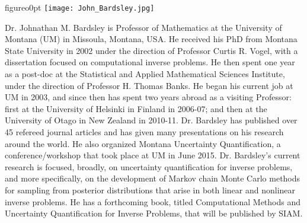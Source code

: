 \begin{wrapfloat}{figure}{o}{0pt}
\texttt{[image: John\_Bardsley.jpg]}
\end{wrapfloat}
Dr. Johnathan M. Bardsley is Professor of Mathematics at the University of Montana (UM) in Missoula, Montana, USA. He received his PhD from Montana State University in 2002 under the direction of Professor Curtis R. Vogel, with a dissertation focused on computational inverse problems. He then spent one year as a post-doc at the Statistical and Applied Mathematical Sciences Institute, under the direction of Professor H. Thomas Banks. He began his current job at UM in 2003, and since then has spent two years abroad as a visiting Professor: first at the University of Helsinki in Finland in 2006-07; and then at the University of Otago in New Zealand in 2010-11. Dr. Bardsley has published over 45 refereed journal articles and has given many presentations on his research around the world. He also organized Montana Uncertainty Quantification, a conference/workshop that took place at UM in June 2015. Dr. Bardsley's current research is focused, broadly, on uncertainty quantification for inverse problems, and more specifically, on the development of Markov chain Monte Carlo methods for sampling from posterior distributions that arise in both linear and nonlinear inverse problems. He has a forthcoming book, titled Computational Methods and Uncertainty Quantification for Inverse Problems, that will be published by SIAM.\\

